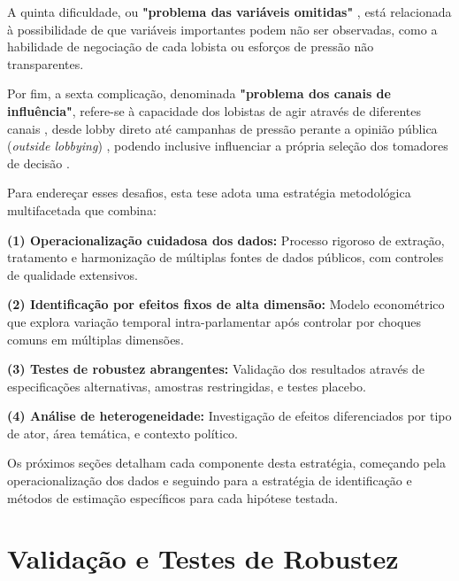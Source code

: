 A quinta dificuldade, ou \textbf{"problema das variáveis omitidas"} \cite{de_figueiredo_advancing_2014}, está relacionada à possibilidade de que variáveis importantes podem não ser observadas, como a habilidade de negociação de cada lobista ou esforços de pressão não transparentes.

Por fim, a sexta complicação, denominada \textbf{"problema dos canais de influência"}, refere-se à capacidade dos lobistas de agir através de diferentes canais \cite{dur_measuring_2008}, desde lobby direto até campanhas de pressão perante a opinião pública (\textit{outside lobbying}) \cite{kollman1998outside}, podendo inclusive influenciar a própria seleção dos tomadores de decisão \cite{fordham2003selection}.

Para endereçar esses desafios, esta tese adota uma estratégia metodológica multifacetada que combina:

\textbf{(1) Operacionalização cuidadosa dos dados:} Processo rigoroso de extração, tratamento e harmonização de múltiplas fontes de dados públicos, com controles de qualidade extensivos.

\textbf{(2) Identificação por efeitos fixos de alta dimensão:} Modelo econométrico que explora variação temporal intra-parlamentar após controlar por choques comuns em múltiplas dimensões.

\textbf{(3) Testes de robustez abrangentes:} Validação dos resultados através de especificações alternativas, amostras restringidas, e testes placebo.

\textbf{(4) Análise de heterogeneidade:} Investigação de efeitos diferenciados por tipo de ator, área temática, e contexto político.

Os próximos seções detalham cada componente desta estratégia, começando pela operacionalização dos dados e seguindo para a estratégia de identificação e métodos de estimação específicos para cada hipótese testada.







\section{Validação e Testes de Robustez}


